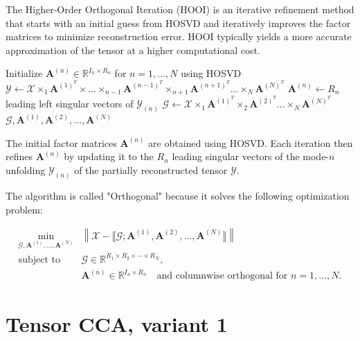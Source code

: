 \documentclass[a4paper,14pt]{article}
\theoremstyle{plain} %
\theoremstyle{definition} %
\theoremstyle{remark} %
\theoremstyle{definition}
\theoremstyle{remark}
\theoremstyle{remark}
\begin{document}
	The Higher-Order Orthogonal Iteration (HOOI) is an iterative refinement method that starts with an initial guess from HOSVD and iteratively improves the factor matrices to minimize reconstruction error. HOOI typically yields a more accurate approximation of the tensor at a higher computational cost.
	
	\begin{algorithm}
		\caption{HOOI}
		\label{alg:HOOI}
		\begin{algorithmic}
			\State Initialize $\mathbf{A}^{(n)} \in \mathbb{R}^{I_n \times R_n}$ for $n = 1, \dots, N$ using HOSVD
			\Repeat
			\State $\mathcal{Y} \leftarrow \mathcal{X} \times_1 \mathbf{A}^{(1)^T} \times \dots \times_{n-1} \mathbf{A}^{(n-1)^T} \times_{n+1} \mathbf{A}^{(n+1)^T} \dots \times_N \mathbf{A}^{(N)^T}$
			\State $\mathbf{A}^{(n)} \leftarrow R_n$ leading left singular vectors of $\mathcal{Y}_{(n)}$
			\EndFor
			\State $\mathcal{G} \leftarrow \mathcal{X} \times_1 \mathbf{A}^{(1)^T} \times_2 \mathbf{A}^{(2)^T} \dots \times_N \mathbf{A}^{(N)^T}$
			\State \Return $\mathcal{G}, \mathbf{A}^{(1)}, \mathbf{A}^{(2)}, \dots, \mathbf{A}^{(N)}$
			\EndProcedure
		\end{algorithmic}
	\end{algorithm}
	
	The initial factor matrices \(\mathbf{A}^{(n)}\) are obtained using HOSVD. Each iteration then refines \(\mathbf{A}^{(n)}\) by updating it to the \(R_n\) leading singular vectors of the mode-\(n\) unfolding \(\mathcal{Y}_{(n)}\) of the partially reconstructed tensor \(\mathcal{Y}\).
	
	The algorithm is called "Orthogonal" because it solves the following optimization problem:
	
	\[
	\begin{aligned}
		\min_{\mathcal{G}, \mathbf{A}^{(1)}, \ldots, \mathbf{A}^{(N)}} 
		&\left\| \mathcal{X} - \llbracket \mathcal{G}; \mathbf{A}^{(1)}, \mathbf{A}^{(2)}, \ldots, \mathbf{A}^{(N)} \rrbracket \right\| \\
		\text{subject to} \quad 
		&\mathcal{G} \in \mathbb{R}^{R_1 \times R_2 \times \cdots \times R_N}, \\
		&\mathbf{A}^{(n)} \in \mathbb{R}^{I_n \times R_n} \quad \text{and columnwise orthogonal for } n = 1, \ldots, N.
	\end{aligned}
	\]
	
	\section{Tensor CCA, variant 1}
	
\end{document}

